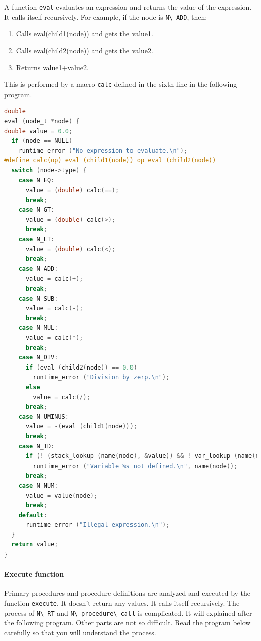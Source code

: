 A function \passthrough{\lstinline!eval!} evaluates an expression and
returns the value of the expression. It calls itself recursively. For
example, if the node is \passthrough{\lstinline!N\_ADD!}, then:

\begin{enumerate}
\def\labelenumi{\arabic{enumi}.}
\tightlist
\item
  Calls eval(child1(node)) and gets the value1.
\item
  Calls eval(child2(node)) and gets the value2.
\item
  Returns value1+value2.
\end{enumerate}

This is performed by a macro \passthrough{\lstinline!calc!} defined in
the sixth line in the following program.

\begin{lstlisting}[language=C]
double
eval (node_t *node) {
double value = 0.0;
  if (node == NULL)
    runtime_error ("No expression to evaluate.\n");
#define calc(op) eval (child1(node)) op eval (child2(node))
  switch (node->type) {
    case N_EQ:
      value = (double) calc(==);
      break;
    case N_GT:
      value = (double) calc(>);
      break;
    case N_LT:
      value = (double) calc(<);
      break;
    case N_ADD:
      value = calc(+);
      break;
    case N_SUB:
      value = calc(-);
      break;
    case N_MUL:
      value = calc(*);
      break;
    case N_DIV:
      if (eval (child2(node)) == 0.0)
        runtime_error ("Division by zerp.\n");
      else
        value = calc(/);
      break;
    case N_UMINUS:
      value = -(eval (child1(node)));
      break;
    case N_ID:
      if (! (stack_lookup (name(node), &value)) && ! var_lookup (name(node), &value) )
        runtime_error ("Variable %s not defined.\n", name(node));
      break;
    case N_NUM:
      value = value(node);
      break;
    default:
      runtime_error ("Illegal expression.\n");
  }
  return value;
}
\end{lstlisting}

\hypertarget{execute-function}{%
\paragraph{Execute function}\label{execute-function}}

Primary procedures and procedure definitions are analyzed and executed
by the function \passthrough{\lstinline!execute!}. It doesn't return any
values. It calls itself recursively. The process of
\passthrough{\lstinline!N\_RT!} and
\passthrough{\lstinline!N\_procedure\_call!} is complicated. It will
explained after the following program. Other parts are not so difficult.
Read the program below carefully so that you will understand the
process.


